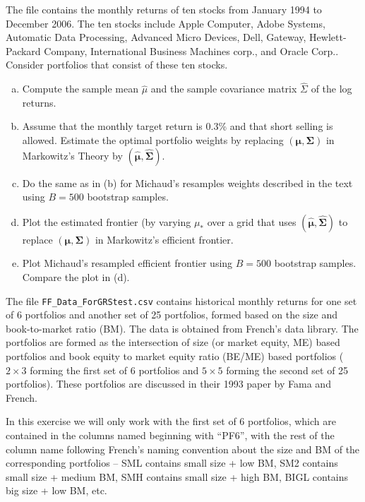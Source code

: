 \prob The file  contains the monthly returns of ten stocks from January 1994 to December 2006. The ten stocks include Apple Computer, Adobe Systems, Automatic Data Processing, Advanced Micro Devices, Dell, Gateway, Hewlett-Packard Company, International Business Machines corp., and Oracle Corp.. Consider portfolios that consist of these ten stocks.
	\begin{enumerate}[(a)]
	\item Compute the sample mean $\hat{\mu}$ and the sample covariance matrix $\hat{\Sigma}$ of the log returns. 
	\item Assume that the monthly target return is 0.3\% and that short selling is allowed. Estimate the optimal portfolio weights by replacing $(\mathbf{\mu},\mathbf{\Sigma})$ in Markowitz's Theory by $(\hat{\mathbf{\mu}}, \hat{\mathbf{\Sigma}})$. 
	\item Do the same as in (b) for Michaud's resamples weights described in the text using $B=500$ bootstrap samples.
	\item Plot the estimated frontier (by varying $\mu_*$ over a grid that uses $(\hat{\mathbf{\mu}},\hat{\mathbf{\Sigma}})$ to replace $(\mathbf{\mu},\mathbf{\Sigma})$ in Markowitz's efficient frontier.
	\item Plot Michaud's resampled efficient frontier using $B=500$ bootstrap samples. Compare the plot in (d). \twomedskip
	\end{enumerate}


\prob The file {\tt FF\_Data\_ForGRStest.csv} contains historical monthly returns for one set of 6 portfolios and another set of 25 portfolios, formed based on the size and book-to-market ratio (BM). The data is obtained from French's data library. The portfolios are formed as the intersection of size (or market equity, ME) based portfolios and book equity to market equity ratio (BE/ME) based portfolios ($2 \times 3$ forming the first set of 6 portfolios and $5 \times 5$ forming the second set of 25 portfolios). These portfolios are discussed in their 1993 paper by Fama and French.

In this exercise we will only work with the first set of 6 portfolios, which are contained in the columns named beginning with ``PF6'', with the rest of the column name following French's naming convention about the size and BM of the corresponding portfolios -- SML contains small size + low BM, SM2 contains small size + medium BM, SMH contains small size + high BM, BIGL contains big size + low BM, etc.

